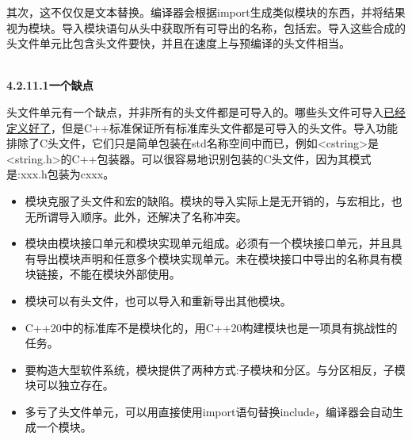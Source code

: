 其次，这不仅仅是文本替换。编译器会根据import生成类似模块的东西，并将结果视为模块。导入模块语句从头中获取所有可导出的名称，包括宏。导入这些合成的头文件单元比包含头文件要快，并且在速度上与预编译的头文件相当。

\hspace*{\fill} \\ %
\noindent
\textbf{4.2.11.1\hspace{0.2cm}一个缺点}

头文件单元有一个缺点，并非所有的头文件都是可导入的。哪些头文件可导入\href{https://en.cppreference.com/w/cpp/language/ub}{已经定义好了}，但是C++标准保证所有标准库头文件都是可导入的头文件。导入功能排除了C头文件，它们只是简单包装在std名称空间中而已，例如<cstring>是<string.h>的C++包装器。可以很容易地识别包装的C头文件，因为其模式是:xxx.h包装为cxxx。

\begin{tcolorbox}[breakable,enhanced jigsaw,colback=mygreen!5!white,colframe=mygreen!75!black,title={使用Microsoft编译器构建可执行文件}]

\begin{itemize}
\item 
模块克服了头文件和宏的缺陷。模块的导入实际上是无开销的，与宏相比，也无所谓导入顺序。此外，还解决了名称冲突。

\item 
模块由模块接口单元和模块实现单元组成。必须有一个模块接口单元，并且具有导出模块声明和任意多个模块实现单元。未在模块接口中导出的名称具有模块链接，不能在模块外部使用。

\item 
模块可以有头文件，也可以导入和重新导出其他模块。

\item 
C++20中的标准库不是模块化的，用C++20构建模块也是一项具有挑战性的任务。

\item 
要构造大型软件系统，模块提供了两种方式:子模块和分区。与分区相反，子模块可以独立存在。

\item 
多亏了头文件单元，可以用直接使用import语句替换include，编译器会自动生成一个模块。
\end{itemize}

\end{tcolorbox}

\newpage









































